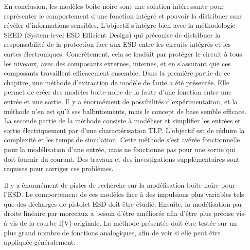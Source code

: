 En conclusion, les modèles boite-noire sont une solution intéressante pour représenter le comportement d'une fonction intégré et pouvoir la distribuer sans révéler d'informations sensibles.
L'objectif s'intègre bien avec la méthodologie SEED (System-level ESD Efficient Design) qui préconise de distribuer la responsabilité de la protection face aux ESD entre les circuits intégrés et les cartes électroniques.
Concrètement, cela se traduit par protéger le circuit à tous les niveaux, avec des composants externes, internes, et en s'assurant que ces composants travaillent efficacement ensemble.
Dans la première partie de ce chapitre, une méthode d'extraction de modèle de faute a été présentée.
Elle permet de créer des modèles boite-noire de la faute d'une fonction entre une entrée et une sortie.
Il y a énormément de possibilités d'expérimentation, et la méthode n'en est qu'à ses balbutiements, mais le concept de base semble efficace.
La seconde partie de la méthode consiste à modéliser et simplifier les entrées et sortie électriquement par d'une charactérisation TLP.
L'objectif est de réduire la complexité et les temps de simulation.
Cette méthode s'est avérée fonctionnelle pour la modélisation d'une entrée, mais ne fonctionne pas pour une sortie qui doit fournir du courant.
Des travaux et des investigations supplémentaires sont requises pour corriger ces problèmes.

Il y a énormément de pistes de recherche sur la modélisation boite-noire pour l'ESD.
Le comportement de ces modèles face à des impulsions plus variables tels que des décharges de pistolet ESD doit être étudié.
Ensuite, la modélisation par droite linéaire par morceaux a besoin d'être améliorée afin d'être plus précise vis-à-vis de la courbe I(V) originale.
La méthode présentée doit être testée sur un plus grand nombre de fonctions analogiques, afin de voir si elle peut être appliquée généralement.
